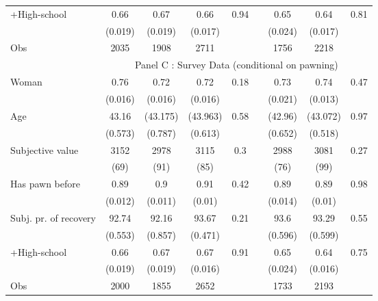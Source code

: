 \begin{tabular}{lcccccccc}
+High-school & 0.66  & 0.67  & 0.66  & 0.94  &       & 0.65  & 0.64  & 0.81 \\
      & (0.019) & (0.019) & (0.017) &       &       & (0.024) & (0.017) &  \\
\midrule
Obs   & 2035  & 1908  & 2711  &       &       & 1756  & 2218  &  \\
\midrule
      & \multicolumn{8}{c}{Panel C : Survey Data (conditional on pawning)} \\
\midrule
\midrule
Woman & 0.76  & 0.72  & 0.72  & 0.18  &       & 0.73  & 0.74  & 0.47 \\
      & (0.016) & (0.016) & (0.016) &       &       & (0.021) & (0.013) &  \\
Age   & 43.16 & (43.175) & (43.963) & 0.58  &       & (42.96) & (43.072) & 0.97 \\
      & (0.573) & (0.787) & (0.613) &       &       & (0.652) & (0.518) &  \\
Subjective value & 3152  & 2978  & 3115  & 0.3   &       & 2988  & 3081  & 0.27 \\
      & (69)  & (91)  & (85)  &       &       & (76)  & (99)  &  \\
Has pawn before & 0.89  & 0.9   & 0.91  & 0.42  &       & 0.89  & 0.89  & 0.98 \\
      & (0.012) & (0.011) & (0.01) &       &       & (0.014) & (0.01) &  \\
Subj. pr. of recovery & 92.74 & 92.16 & 93.67 & 0.21  &       & 93.6  & 93.29 & 0.55 \\
      & (0.553) & (0.857) & (0.471) &       &       & (0.596) & (0.599) &  \\
+High-school & 0.66  & 0.67  & 0.67  & 0.91  &       & 0.65  & 0.64  & 0.75 \\
      & (0.019) & (0.019) & (0.016) &       &       & (0.024) & (0.016) &  \\
\midrule
Obs   & 2000  & 1855  & 2652  &       &       & 1733  & 2193  &  \\
\bottomrule
\bottomrule
\end{tabular}%
